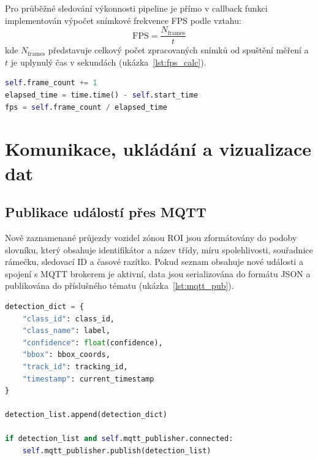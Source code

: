 \documentclass[male,czech,api_bc]{kitheses}
\begin{document}

Pro průběžné sledování výkonnosti pipeline je přímo v callback funkci implementován výpočet snímkové frekvence \acs{FPS} podle vztahu:
\[
\text{FPS} = \frac{N_{\text{frames}}}{t}
\]
kde $N_{\text{frames}}$ představuje celkový počet zpracovaných snímků od spuštění měření a $t$ je uplynulý čas v sekundách (ukázka~\ref{lst:fps_calc}).

\begin{lstlisting}[language=Python, caption={Průběžný výpočet FPS během běhu pipeline.}, label={lst:fps_calc}]
self.frame_count += 1
elapsed_time = time.time() - self.start_time
fps = self.frame_count / elapsed_time
\end{lstlisting}


\section{Komunikace, ukládání a vizualizace dat}

\subsection{Publikace událostí přes MQTT}
Nově zaznamenané průjezdy vozidel zónou ROI jsou zformátovány do podoby slovníku, který obsahuje identifikátor a název třídy, míru spolehlivosti, souřadnice rámečku, sledovací ID a časové razítko. Pokud seznam obsahuje nové události a spojení s MQTT brokerem je aktivní, data jsou serializována do formátu JSON a publikována do příslušného tématu (ukázka~\ref{lst:mqtt_pub}).

\begin{lstlisting}[language=Python, caption={Sestavení a publikace detekčních událostí přes MQTT.}, label={lst:mqtt_pub}]
detection_dict = {
    "class_id": class_id,
    "class_name": label,
    "confidence": float(confidence),
    "bbox": bbox_coords,
    "track_id": tracking_id,
    "timestamp": current_timestamp
}

detection_list.append(detection_dict)

if detection_list and self.mqtt_publisher.connected:
    self.mqtt_publisher.publish(detection_list)
\end{lstlisting}
\end{document}
